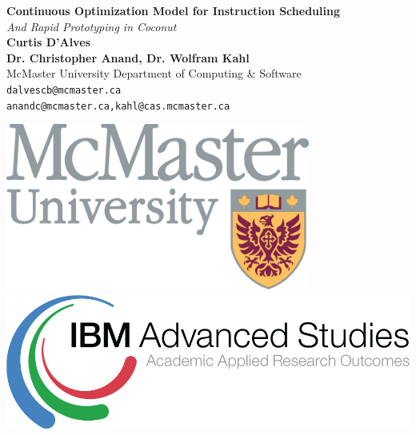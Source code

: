 \documentclass[a0,landscape,24pt]{a0poster}
\begin{document}


\begin{minipage}[b]{0.75\linewidth}
\veryHuge \color{NavyBlue} \textbf{Continuous Optimization Model for Instruction Scheduling} \color{Black}\\ %
\Huge\textit{And Rapid Prototyping in Coconut}\\[2cm] %
\huge \textbf{Curtis D'Alves}\\[0.5cm] %
\huge \textbf{Dr. Christopher Anand, Dr. Wolfram Kahl}\\[0.5cm] %
\huge McMaster University Department of Computing \& Software \\[0.4cm] %
\Large \texttt{dalvescb@mcmaster.ca} \\
\Large \texttt{anandc@mcmaster.ca,kahl@cas.mcmaster.ca} \\

\end{minipage}
%
\begin{minipage}[b]{0.25\linewidth}
\includegraphics[width=10cm]{maclogo.jpg}\\
\includegraphics[width=20cm]{logo.png}\\
\end{minipage}
\end{document}
